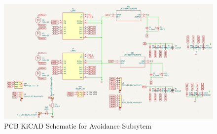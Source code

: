 \begin{figure}[H]
	\centering
	\includegraphics[width=\textwidth]{./Images/pcb-avoidance-headers2.png}
	\caption{\label{fig:pcb-motor}PCB KiCAD Schematic for Avoidance Subsytem}
\end{figure}

